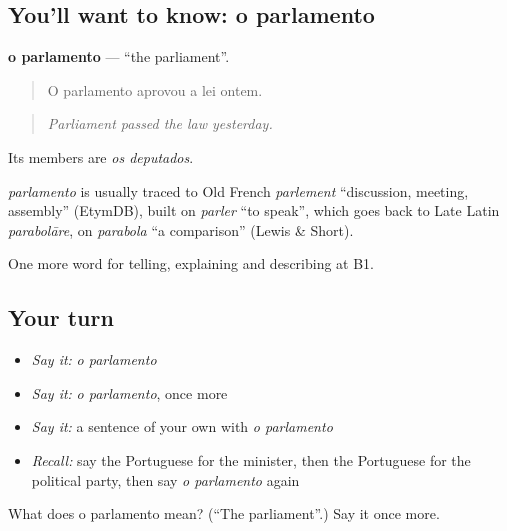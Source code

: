 \subsection*{You'll want to know: o parlamento}
\textbf{o parlamento} — \textquotedblleft{}the parliament\textquotedblright{}.

\begin{quote}
O parlamento aprovou a lei ontem.
\end{quote}

\begin{quote}
\emph{Parliament passed the law yesterday.}
\end{quote}

Its members are \emph{os deputados}.

\begin{cousinweb}
\emph{parlamento} is usually traced to Old French \emph{parlement} \textquotedblleft{}discussion, meeting, assembly\textquotedblright{} (EtymDB), built on \emph{parler} \textquotedblleft{}to speak\textquotedblright{}, which goes back to Late Latin \emph{parabolāre}, on \emph{parabola} \textquotedblleft{}a comparison\textquotedblright{} (Lewis \& Short).
\end{cousinweb}

\begin{grammarlens}[title={What you've built}]
One more word for telling, explaining and describing at B1.
\end{grammarlens}

\subsection*{Your turn}
\begin{itemize}
\raggedright
  \item \emph{Say it:} \emph{o parlamento}
  \item \emph{Say it:} \emph{o parlamento}, once more
  \item \emph{Say it:} a sentence of your own with \emph{o parlamento}
  \item \emph{Recall:} say the Portuguese for the minister, then the Portuguese for the political party, then say \emph{o parlamento} again
\end{itemize}

\begin{tcolorbox}[breakable,colback=teal!4,colframe=teal!35!black,title={Before you move on}]
What does o parlamento mean? (\textquotedblleft{}The parliament\textquotedblright{}.) Say it once more.
\end{tcolorbox}
